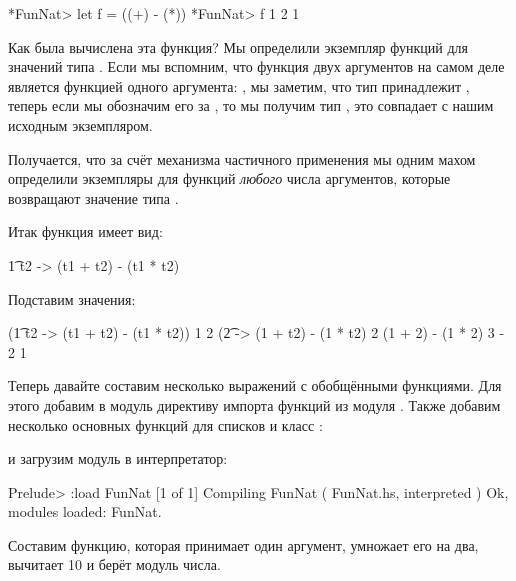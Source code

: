 \begin{code}
*FunNat> let f = ((+) - (*))
*FunNat> f 1 2
1
\end{code}

Как была вычислена эта функция? Мы определили экземпляр функций
для значений типа . Если мы вспомним, что
функция двух аргументов на самом деле является функцией одного
аргумента: , мы заметим, что 
тип  принадлежит , теперь если 
мы обозначим его за , то мы получим тип ,
это совпадает с нашим исходным экземпляром. 

Получается, что за счёт механизма частичного применения мы одним
махом определили экземпляры  для функций \emph{любого} 
числа аргументов, которые возвращают значение типа .

Итак функция  имеет вид:

\begin{code}
\t1 t2 -> (t1 + t2) - (t1 * t2)
\end{code}

Подставим значения:

\begin{code}
(\t1 t2 -> (t1 + t2) - (t1 * t2)) 1 2
(\t2 -> (1 + t2) - (1 * t2) 2
(1 + 2) - (1 * 2)
3 - 2
1
\end{code}

Теперь давайте составим несколько выражений 
с обобщёнными функциями.
Для этого добавим в модуль  директиву импорта
функций из модуля . Также добавим несколько
основных функций для списков и класс :


и загрузим модуль в интерпретатор:

\begin{code}
Prelude> :load FunNat
[1 of 1] Compiling FunNat           ( FunNat.hs, interpreted )
Ok, modules loaded: FunNat.
\end{code}

Составим функцию, которая принимает один аргумент, 
умножает его на два, вычитает 10 и берёт модуль числа.

